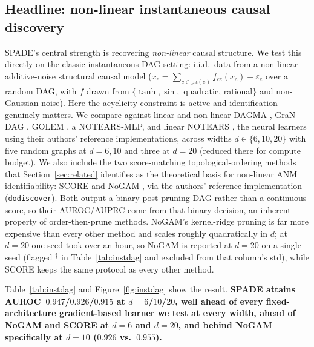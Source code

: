 \subsection{Headline: non-linear instantaneous causal discovery}
\label{sec:instdag}

SPADE's central strength is recovering \emph{non-linear} causal structure. We
test this directly on the classic instantaneous-DAG setting: i.i.d.\ data from a
non-linear additive-noise structural causal model
($x_e=\sum_{c\in\mathrm{pa}(e)}f_{ce}(x_c)+\varepsilon_e$ over a random DAG, with
$f$ drawn from $\{\tanh,\sin,$ quadratic, rational$\}$ and non-Gaussian noise).
Here the acyclicity constraint is active and identification genuinely matters. We
compare against linear and non-linear DAGMA \citep{Bello2022}, GraN-DAG
\citep{lachapelle2020grandag}, GOLEM \citep{ng2020golem}, a NOTEARS-MLP, and
linear NOTEARS \citep{Zheng2018}, the neural learners using their authors'
reference implementations, across widths $d\in\{6,10,20\}$ with five random
graphs at $d{=}6,10$ and three at $d{=}20$ (reduced there for compute budget).
We also include the two score-matching topological-ordering methods that
Section~\ref{sec:related} identifies as the theoretical basis for non-linear ANM
identifiability: SCORE \citep{rolland2022score} and NoGAM
\citep{montagna2023nogam}, via the authors' reference implementation
(\texttt{dodiscover}). Both output a binary post-pruning DAG rather than a
continuous score, so their AUROC/AUPRC come from that binary decision, an
inherent property of order-then-prune methods. NoGAM's kernel-ridge pruning is far
more expensive than every other method and scales roughly quadratically in $d$;
at $d{=}20$ one seed took over an hour, so NoGAM is reported at $d{=}20$ on a
single seed (flagged $^\dagger$ in Table~\ref{tab:instdag} and excluded from that
column's std), while SCORE keeps the same protocol as every other method.

\begin{table}[t]
\centering
\caption{Non-linear instantaneous-DAG recovery (AUROC$\,\pm\,$std by width $d$;
F1 overall). SPADE beats every fixed-architecture gradient-based learner
(DAGMA-nonlinear/-linear, GraN-DAG, NOTEARS-MLP, GOLEM, linear NOTEARS) at every
width, and beats the score-matching methods SCORE and NoGAM at $d{=}6,20$; NoGAM
leads at $d{=}10$.}
\label{tab:instdag}
\end{table}

Table~\ref{tab:instdag} and Figure~\ref{fig:instdag} show the result.
\textbf{SPADE attains AUROC~$0.947$/$0.926$/$0.915$ at $d{=}6$/$10$/$20$,
well ahead of every fixed-architecture gradient-based learner we test at every
width, ahead of NoGAM and SCORE at $d{=}6$ and $d{=}20$, and behind NoGAM
specifically at $d{=}10$ ($0.926$ vs.\ $0.955$).}


